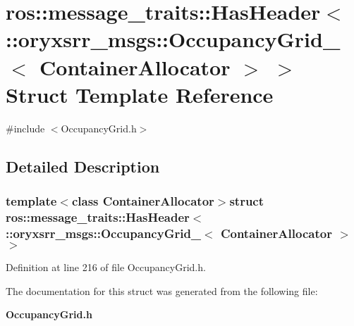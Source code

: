 \section{ros\-:\-:message\-\_\-traits\-:\-:\-Has\-Header$<$ \-:\-:oryxsrr\-\_\-msgs\-:\-:\-Occupancy\-Grid\-\_\-$<$ \-Container\-Allocator $>$ $>$ \-Struct \-Template \-Reference}
\label{structros_1_1message__traits_1_1HasHeader_3_01_1_1oryxsrr__msgs_1_1OccupancyGrid___3_01ContainerAllocator_01_4_01_4}


{\ttfamily \#include $<$\-Occupancy\-Grid.\-h$>$}



\subsection{\-Detailed \-Description}
\subsubsection*{template$<$class Container\-Allocator$>$struct ros\-::message\-\_\-traits\-::\-Has\-Header$<$ \-::oryxsrr\-\_\-msgs\-::\-Occupancy\-Grid\-\_\-$<$ Container\-Allocator $>$ $>$}



\-Definition at line 216 of file \-Occupancy\-Grid.\-h.



\-The documentation for this struct was generated from the following file\-:\begin{DoxyCompactItemize}
\item 
{\bf \-Occupancy\-Grid.\-h}\end{DoxyCompactItemize}
